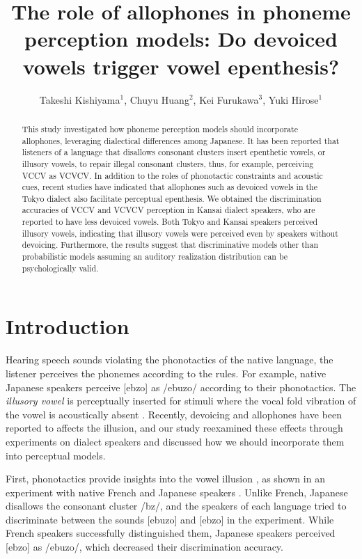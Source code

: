 \documentclass[a4paper,11pt,twocolumn]{article}
\title{The role of allophones in phoneme perception models: Do devoiced vowels trigger vowel epenthesis?}
\author{
    Takeshi Kishiyama$^1$,
    Chuyu Huang$^2$,
    Kei Furukawa$^3$,
    Yuki Hirose$^1$}
\begin{document}
\maketitle

\begin{abstract}
This study investigated how phoneme perception models should incorporate allophones, leveraging dialectical differences among Japanese. It has been reported that listeners of a language that disallows consonant clusters insert epenthetic vowels, or illusory vowels, to repair illegal consonant clusters, thus, for example, perceiving VCCV as VCVCV. In addition to the roles of phonotactic constraints and acoustic cues, recent studies have indicated that allophones such as devoiced vowels in the Tokyo dialect also facilitate perceptual epenthesis. We obtained the discrimination accuracies of VCCV and VCVCV perception in Kansai dialect speakers, who are reported to have less devoiced vowels. Both Tokyo and Kansai speakers perceived illusory vowels, indicating that illusory vowels were perceived even by speakers without devoicing. Furthermore, the results suggest that discriminative models other than probabilistic models assuming an auditory realization distribution can be psychologically valid.
\end{abstract}


\section{Introduction}

Hearing speech sounds violating the phonotactics of the native language, the listener perceives the phonemes according to the rules. For example, native Japanese speakers perceive [ebzo] as /ebuzo/ according to their phonotactics. The \textit{illusory vowel} is perceptually inserted for stimuli where the vocal fold vibration of the vowel is acoustically absent \cite{dupoux1999epentheticvi, dupoux2011illusory}. Recently, devoicing and allophones have been reported to affects the illusion, and our study reexamined these effects through experiments on dialect speakers and discussed how we should incorporate them into perceptual models.

First, phonotactics provide insights into the vowel illusion \cite{dupoux1999epentheticvi, halle2014special, monahan2009not, mattingley2015influence, guevara2017predicting, guevara2017epenthetic}, as shown in an experiment with native French and Japanese speakers \cite{dupoux1999epentheticvi}. Unlike French, Japanese disallows the consonant cluster /bz/, and the speakers of each language tried to discriminate between the sounds [ebuzo] and [ebzo] in the experiment. While French speakers successfully distinguished them, Japanese speakers perceived [ebzo] as /ebuzo/, which decreased their discrimination accuracy.
\end{document}
